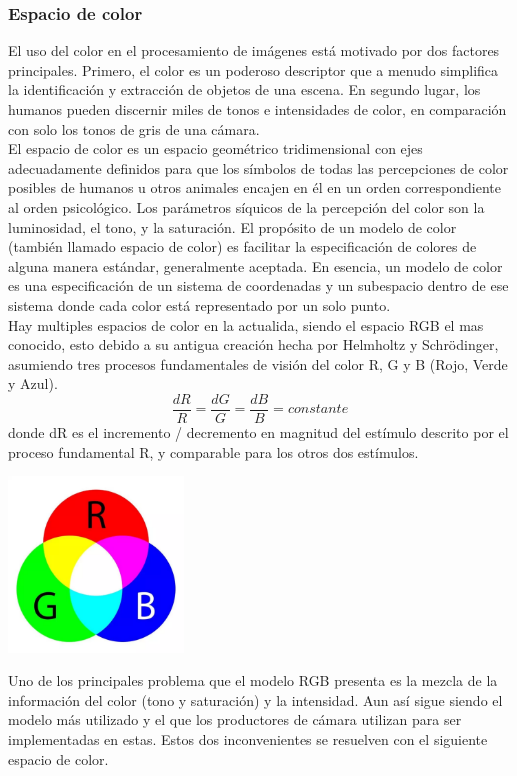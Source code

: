 \subsubsection{Espacio de color}
El uso del color en el procesamiento de imágenes está motivado por dos factores principales.
Primero, el color es un poderoso descriptor que a menudo simplifica la identificación y
extracción de objetos de una escena. En segundo lugar, los humanos pueden discernir miles
de tonos e intensidades de color, en comparación con solo los tonos de gris de una cámara.\cite{Book:Rafael2002}\\
El espacio de color es un espacio geométrico tridimensional con ejes adecuadamente
definidos para que los símbolos de todas las percepciones de color posibles de humanos u
otros animales encajen en él en un orden correspondiente al orden psicológico.
Los parámetros síquicos de la percepción del color son la luminosidad, el tono, y
la saturación. El propósito de un modelo de color (también llamado espacio de color) es
facilitar la especificación de colores de alguna manera estándar, generalmente aceptada.
En esencia, un modelo de color es una especificación de un sistema de coordenadas y un
subespacio dentro de ese sistema donde cada color está representado por un solo punto.\\
Hay multiples espacios de color en la actualida, siendo el espacio RGB el mas conocido, esto
debido a su antigua creación hecha por Helmholtz y Schrödinger, asumiendo
tres procesos fundamentales de visión del color R, G y B (Rojo, Verde y Azul).
\begin{equation}
	\frac{dR}{R} = \frac{dG}{G} = \frac{dB}{B} = constante
\end{equation}
donde dR es el incremento / decremento en magnitud del estímulo descrito por el proceso
fundamental R, y comparable para los otros dos estímulos.\cite{Book:Rolf2003}
\begin{center}
	\includegraphics[width=0.35\textwidth]{Contenido/Cuerpo/Capitulo2/Fig10.eps}
	\label{fig:MarcoTeorico:Fig20}
\end{center}
Uno de los principales problema que el modelo RGB presenta es la mezcla de la información
del color (tono y saturación) y la intensidad. Aun así sigue siendo el modelo más utilizado y
el que los productores de cámara utilizan para ser implementadas en estas. Estos dos inconvenientes
se resuelven con el siguiente espacio de color.
